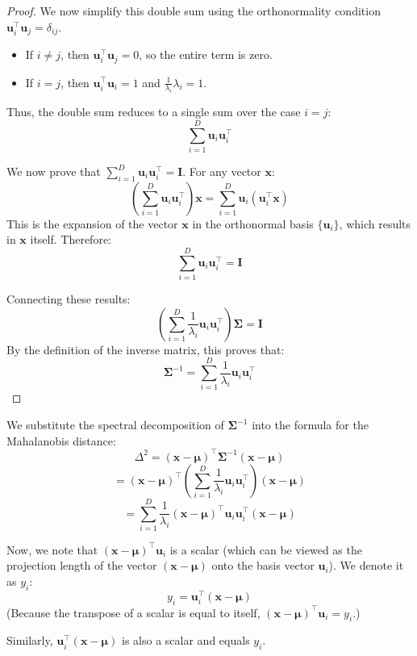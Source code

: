 \documentclass[../main.tex]{subfiles}
\begin{document}
\begin{proof}
We now simplify this double sum using the orthonormality condition $\mathbf{u}_i^\top \mathbf{u}_j = \delta_{ij}$.
\begin{itemize}
    \item If $i \neq j$, then $\mathbf{u}_i^\top \mathbf{u}_j = 0$, so the entire term is zero.
    \item If $i = j$, then $\mathbf{u}_i^\top \mathbf{u}_i = 1$ and $\frac{1}{\lambda_i} \lambda_i = 1$.
\end{itemize}
Thus, the double sum reduces to a single sum over the case $i=j$:
$$
\sum_{i=1}^{D} \mathbf{u}_i \mathbf{u}_i^\top
$$

We now prove that $\sum_{i=1}^{D} \mathbf{u}_i \mathbf{u}_i^\top = \mathbf{I}$. For any vector $\mathbf{x}$:
$$
\left( \sum_{i=1}^{D} \mathbf{u}_i \mathbf{u}_i^\top \right) \mathbf{x} = \sum_{i=1}^{D} \mathbf{u}_i (\mathbf{u}_i^\top \mathbf{x})
$$
This is the expansion of the vector $\mathbf{x}$ in the orthonormal basis $\{\mathbf{u}_i\}$, which results in $\mathbf{x}$ itself. Therefore:
$$
\sum_{i=1}^{D} \mathbf{u}_i \mathbf{u}_i^\top = \mathbf{I}
$$

Connecting these results:
$$
\left( \sum_{i=1}^{D} \frac{1}{\lambda_i} \mathbf{u}_i \mathbf{u}_i^\top \right) \boldsymbol{\Sigma} = \mathbf{I}
$$
By the definition of the inverse matrix, this proves that:
$$
\boldsymbol{\Sigma}^{-1} = \sum_{i=1}^{D} \frac{1}{\lambda_i} \mathbf{u}_i \mathbf{u}_i^\top
$$
\end{proof}

We substitute the spectral decomposition of $\boldsymbol{\Sigma}^{-1}$ into the formula for the Mahalanobis distance:
$$
\Delta^2 = (\mathbf{x} - \boldsymbol{\mu})^\top \boldsymbol{\Sigma}^{-1}(\mathbf{x} - \boldsymbol{\mu})
$$
$$
= (\mathbf{x} - \boldsymbol{\mu})^\top \left( \sum_{i=1}^{D} \frac{1}{\lambda_i} \mathbf{u}_i \mathbf{u}_i^\top \right) (\mathbf{x} - \boldsymbol{\mu})
$$
$$
= \sum_{i=1}^{D} \frac{1}{\lambda_i} (\mathbf{x} - \boldsymbol{\mu})^\top \mathbf{u}_i \mathbf{u}_i^\top (\mathbf{x} - \boldsymbol{\mu})
$$

Now, we note that $(\mathbf{x} - \boldsymbol{\mu})^\top \mathbf{u}_i$ is a scalar (which can be viewed as the projection length of the vector $(\mathbf{x} - \boldsymbol{\mu})$ onto the basis vector $\mathbf{u}_i$). We denote it as $y_i$:
$$
y_i = \mathbf{u}_i^\top (\mathbf{x} - \boldsymbol{\mu})
$$
(Because the transpose of a scalar is equal to itself, $(\mathbf{x} - \boldsymbol{\mu})^\top \mathbf{u}_i = y_i$.)

Similarly, $\mathbf{u}_i^\top (\mathbf{x} - \boldsymbol{\mu})$ is also a scalar and equals $y_i$.
\end{document}
